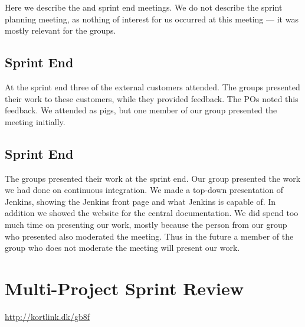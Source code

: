 Here we describe the \gui and \bd sprint end meetings. We do not describe the \db sprint planning meeting, as nothing of interest for us occurred at this meeting --- it was mostly relevant for the \gui groups.

\subsection{\gui Sprint End}
At the \gui sprint end three of the external customers attended. The \gui groups presented their work to these customers, while they provided feedback. The \gui POs noted this feedback. We attended as pigs, but one member of our group presented the meeting initially.

\subsection{\bd Sprint End}
The \bd groups presented their work at the \bd sprint end. Our group presented the work we had done on continuous integration. We made a top-down presentation of Jenkins, showing the Jenkins front page and what Jenkins is capable of. In addition we showed the website for the central documentation. We did spend too much time on presenting our work, mostly because the person from our group who presented also moderated the meeting. Thus in the future a member of the group who does not moderate the meeting will present our work.

\section{Multi-Project Sprint Review}
\url{http://kortlink.dk/gb8f}
